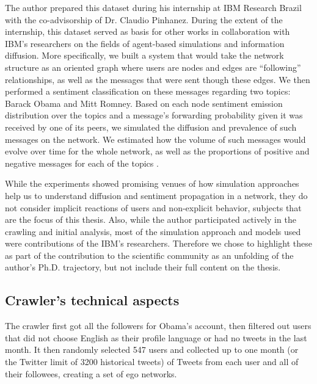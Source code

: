 The author prepared this dataset during his internship at IBM Research Brazil with the co-advisorship of Dr. Claudio Pinhanez. During the extent of the internship, this dataset served as basis for other works in collaboration with IBM's researchers on the fields of agent-based simulations and information diffusion. More specifically, we built a system that would take the network structure as an oriented graph where users are nodes and edges are ``following'' relationships, as well as the messages that were sent though these edges. We then performed a sentiment classification on these messages regarding two topics: Barack Obama and Mitt Romney. Based on each node sentiment emission distribution over the topics and a message's forwarding probability given it was received by one of its peers, we simulated the diffusion and prevalence of such messages on the network. We estimated how the volume of such messages would evolve over time for the whole network, as well as the proportions of positive and negative messages for each of the topics \cite{Gatti2013a, Gatti2013, BarbosaNeto2013}.

While the experiments showed promising venues of how simulation approaches help us to understand diffusion and sentiment propagation in a network, they do not consider implicit reactions of users and non-explicit behavior, subjects that are the focus of this thesis. Also, while the author participated actively in the crawling and initial analysis, most of the simulation approach and models used were contributions of the IBM's researchers. Therefore we chose to highlight these as part of the contribution to the scientific community as an unfolding of the author's Ph.D. trajectory, but not include their full content on the thesis.


\subsection{Crawler's technical aspects}


The crawler first got all the followers for Obama's account, then filtered out users that did not choose English as their profile language or had no tweets in the last month.  It then randomly selected 547 users and collected up to one month (or the Twitter limit of 3200 historical tweets) of Tweets from each user and all of their followees, creating a set of ego networks.

